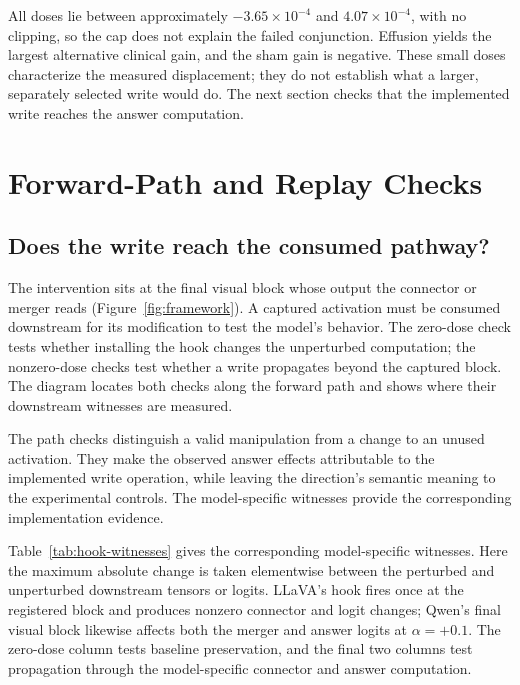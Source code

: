 All doses lie between approximately $-3.65\times10^{-4}$ and
$4.07\times10^{-4}$, with no clipping, so the cap does not explain the
failed conjunction. Effusion yields the largest alternative clinical gain,
and the sham gain is negative. These small doses characterize the measured
displacement; they do not establish what a larger, separately selected
write would do. The next section checks that the implemented write reaches
the answer computation.

\FloatBarrier

\section{Forward-Path and Replay Checks}
\label{app:implementation}

\subsection{Does the write reach the consumed pathway?}

The intervention sits at the final visual block whose output the
connector or merger reads (Figure~\ref{fig:framework}). A captured activation must be
consumed downstream for its modification to test the model's behavior.
The zero-dose check tests whether installing the hook changes the
unperturbed computation; the nonzero-dose checks test whether a write
propagates beyond the captured block. The diagram locates both checks
along the forward path and shows where their downstream witnesses are
measured.


The path checks distinguish a valid manipulation from a change to an
unused activation. They make the observed answer effects attributable to
the implemented write operation, while leaving the direction's semantic
meaning to the experimental controls. The model-specific witnesses provide
the corresponding implementation evidence.

Table~\ref{tab:hook-witnesses} gives the corresponding model-specific
witnesses. Here the maximum absolute change is taken elementwise between
the perturbed and unperturbed downstream tensors or logits. LLaVA's hook
fires once at the registered block and produces nonzero connector and logit
changes; Qwen's final visual block likewise affects both the merger and
answer logits at $\alpha=+0.1$. The zero-dose column tests baseline
preservation, and the final two columns test propagation through the
model-specific connector and answer computation.

